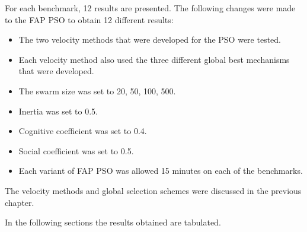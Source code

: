 For each benchmark, 12 results are presented. The following changes were made to the FAP PSO to obtain 12 different results:
\begin{itemize}
\item The two velocity methods that were developed for the PSO were tested.
\item Each velocity method also used the three different global best mechanisms that were developed.
\item The swarm size was set to 20, 50, 100, 500.
\item Inertia was set to 0.5.
\item Cognitive coefficient was set to 0.4.
\item Social coefficient was set to 0.5.
\item Each variant of FAP PSO was allowed 15 minutes on each of the benchmarks.
\end{itemize}
The velocity methods and global selection schemes were discussed in the previous chapter.

In the following sections the results obtained are tabulated.

